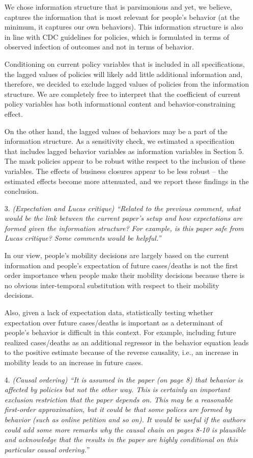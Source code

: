 \documentclass[11pt]{article}
\begin{document}
\begin{itemize}
We chose information structure that is parsimonious and yet, we believe, captures the  information that is most relevant for people's behavior (at the minimum, it captures our own behaviors). This information structure is also in line with CDC guidelines
for policies, which
is formulated in terms of observed infection of outcomes and not in terms of behavior.

Conditioning on current policy variables that is included in all specifications, the lagged values of policies will  likely add little additional information and, therefore, we decided to exclude lagged values of policies from the information structure. We are 
completely free to interpret that the coefficient of current policy variables has both informational content and behavior-constraining effect.

On the other hand, the lagged values of  behaviors may be a part of the information structure. As a sensitivity check, we estimated a specification that includes  lagged behavior variables as information variables in Section 5. The mask policies 
appear to be robust withe respect to the inclusion of these variables. The effects of business closures appear to be less
robust -- the estimated effects become more attenuated, and we report these findings in the conclusion. 
  
\item[3.]  \textit{(Expectation and Lucas critique) ``Related to the previous comment, what would be the link
between the current paper's setup and how expectations are formed given the information
structure? For example, is this paper safe from Lucas critique? Some comments would be
helpful.''}

In our view, people's mobility decisions are largely based on the current information and people's expectation of future cases/deaths is not the first order importance when people make their mobility decisions because there is no obvious inter-temporal substitution with respect to their mobility decisions. 
    
Also, given a lack of expectation data, statistically testing whether expectation over future cases/deaths is important as a determinant of people's behavior is difficult in this context. For example, including future realized cases/deaths as an additional regressor in the behavior equation leads to the positive estimate because of the reverse causality, i.e., an increase in mobility leads to an increase in future cases.
  
\item[4.]  \textit{(Causal ordering) ``It is assumed in the paper (on page 8) that behavior is affected by policies
but not the other way. This is certainly an important exclusion restriction that the paper
depends on. This may be a reasonable first-order approximation, but it could be that some
polices are formed by behavior (such as online petition and so on). It would be useful if
the authors could add some more remarks why the causal chain on pages 8-10 is plausible
and acknowledge that the results in the paper are highly conditional on this particular causal
ordering.''}


\end{itemize}
\end{document}
